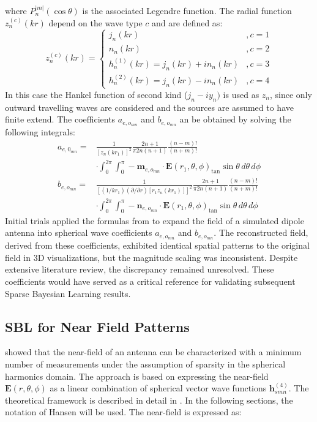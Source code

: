 \documentclass{article}
\begin{document}
where \(P_n^{|m|}(\cos \theta)\) is the associated Legendre function. The radial function \(z_n^{(c)}(kr)\) depend on the wave type \(c\) and are defined as:
\begin{equation}
    z_n^{(c)}(kr) = \begin{cases}
        j_n(kr) & , c = 1 \\
        n_n(kr) & , c = 2 \\
        h_n^{(1)}(kr) = j_n(kr) + i n_n(kr) & , c = 3 \\
        h_n^{(2)}(kr) = j_n(kr) - i n_n(kr) & , c = 4
    \end{cases}
\end{equation}
In this case the Hankel function of second kind (\(j_n-iy_n)\) is used as \(z_n\), since only outward travelling waves are considered and the sources are assumed to have finite extend. The coefficients \(a_{e,o_{mn}}\) and \(b_{e,o_{mn}}\) an be obtained by solving the following integrals:
\begin{equation}
    \begin{split}
        a_{e,0_{mn}} =& \frac{1}{\left[z_n(kr_1)\right]^2} \frac{2n+1}{\pi 2n (n+1)} \frac{(n-m)!}{(n+m)!} \\
        &\cdot \int_0^{2\pi} \int_0^{\pi} -\mathbf{m}_{e,o_{mn}} \cdot \mathbf{E}(r_1, \theta, \phi)_{\tan} \sin \theta \, d\theta \, d\phi\\
        b_{e,o_{mn}} = &\frac{1}{\left[(1/kr_1)(\partial/\partial r) [r_1 z_n(kr_1)]\right]^2} \frac{2n + 1}{\pi 2n (n+1)} \frac{(n - m)!}{(n + m)!}\\
        &\cdot \int_0^{2\pi} \int_0^{\pi} -\mathbf{n}_{e,o_{mn}} \cdot \mathbf{E}(r_1, \theta, \phi)_{\tan} \sin \theta \, d\theta \, d\phi
    \end{split}
    \label{eq:expansion}
\end{equation}
Initial trials applied the formulas from \citet{Ludwig1971NearfieldFT} to expand the field of a simulated dipole antenna into spherical wave coefficients \(a_{e,o_{mn}}\) and \(b_{e,o_{mn}}\). The reconstructed field, derived from these coefficients, exhibited identical spatial patterns to the original field in 3D visualizations, but the magnitude scaling was inconsistent. Despite extensive literature review, the discrepancy remained unresolved. These coefficients would have served as a critical reference for validating subsequent Sparse Bayesian Learning results.


\subsection{SBL for Near Field Patterns}
\citet{Hofmann2019minimum} showed that the near-field of an antenna can be characterized with a minimum number of measurements under the assumption of sparsity in the spherical harmonics domain. The approach is based on expressing the near-field \(\mathbf{E}(r,\theta,\phi)\) as a linear combination of spherical vector wave functions \(\mathbf{h}_{smn}^{(4)}\). The theoretical framework is described in detail in \citet{hansen1988spherical}. In the following sections, the notation of Hansen will be used. The near-field is expressed as:
\end{document}
